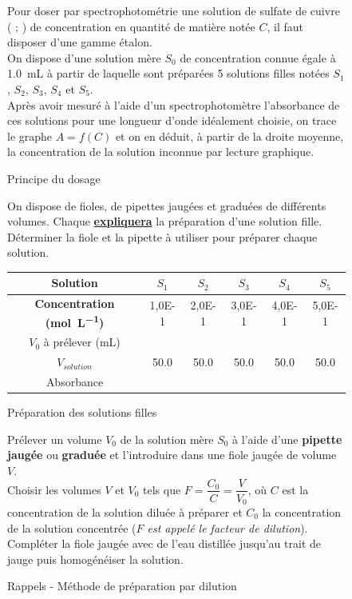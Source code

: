 \documentclass[a4paper,12pt,fleqn]{article}%
\begin{document}
	\begin{figure}[h!]
		\caption{Principe du dosage}
		Pour doser par spectrophotométrie une solution de sulfate de cuivre ( ; ) de concentration en quantité de matière notée $C$, il faut disposer d'une gamme étalon.\\
		On dispose d'une solution mère $S_0$ de concentration connue égale à \SI{1,0}{mL} à partir de laquelle sont préparées 5 solutions filles notées $S_1$, $S_2$, $S_3$, $S_4$ et $S_5$.\\
		Après avoir mesuré à l'aide d'un spectrophotomètre l'absorbance de ces solutions pour une longueur d'onde idéalement choisie, on trace le graphe $A=f(C)$ et on en déduit, à partir de la droite moyenne, la concentration de la solution inconnue par lecture graphique.
	\end{figure}
	
	\begin{figure}[h!]
		\caption{Préparation des solutions filles}
		On dispose de fioles, de pipettes jaugées et graduées de différents volumes. Chaque \textbf{\underline{expliquera}} la préparation d'une solution fille. Déterminer la fiole et la pipette à utiliser pour préparer chaque solution.
		\begin{center}
			\begin{tabular}{|c|c|c|c|c|c|}
				\hline
				\textbf{Solution} & $S_1$ & $S_2$ & $S_3$ & $S_4$ & $S_5$\\
				\hline
				\textbf{Concentration (\unit{\mole\per\liter})} & \num{1,0E-1} & \num{2,0E-1}& \num{3,0E-1}& \num{4,0E-1}& \num{5,0E-1}\\
				\hline
				$V_0$ à prélever (\unit{mL}) & & & & & \\
				\hline
				$V_{solution}$ & \num{50,0} & \num{50,0} & \num{50,0} & \num{50,0} & \num{50,0}\\
				\hline
				Absorbance& & & & & \\
				\hline
			\end{tabular}
		\end{center}
	\end{figure}
	
	\begin{figure}[h!]
		\caption*{Rappels - Méthode de préparation par dilution}
		Prélever un volume $V_0$ de la solution mère $S_0$ à l’aide d’une \textbf{pipette jaugée }ou \textbf{graduée} et 		l’introduire dans une fiole jaugée de volume $V$.\\
		Choisir les volumes $V$ et $V_0$ tels que $F = \dfrac{C_0}{C} = \dfrac{V}{V_0}$, où $C$ est la concentration de la solution diluée à préparer et $C_0$ la concentration de la solution concentrée (\emph{$F$ est appelé le facteur de dilution}).\\
		Compléter la fiole jaugée avec de l’eau distillée jusqu’au trait de jauge puis homogénéiser la
		solution.
	\end{figure}
	
\end{document}
